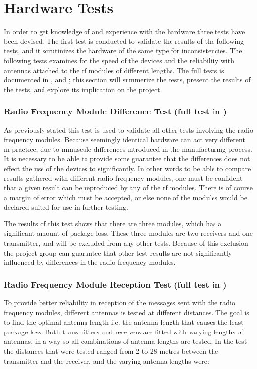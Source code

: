 \section{Hardware Tests} %
\label{sec:hardware_tests}
In order to get knowledge of and experience with the hardware three tests have been devised.
The first test is conducted to validate the results of the following tests, and it scrutinizes the hardware of the same type for inconsistencies.
The following tests examines for the speed of the devices and the reliability with antennas attached to the \gls{rf} modules of different lengths.
The full tests is documented in ,  and ; 
this section will summerize the tests, present the results of the tests, and explore its implication on the project.

\subsubsection*{Radio Frequency Module Difference Test (full test in )}%
\label{ssub:radio_frequency_module_difference_test}
As previously stated this test is used to validate all other tests involving the radio frequency modules.
Because seemingly identical hardware can act very different in practice, due to minuscule differences introduced in the manufacturing process.
It is necessary to be able to provide some guarantee that the differences does not effect the use of the devices to significantly.
In other words to be able to compare results gathered with different radio frequency modules, one must be confident that a given result can be reproduced by any of the \gls{rf} modules.
There is of course a margin of error which must be accepted, or else none of the modules would be declared suited for use in further testing.

The results of this test shows that there are three modules, which has a significant amount of package loss.
These three modules are two receivers and one transmitter, and will be excluded from any other tests.
Because of this exclusion the project group can guarantee that other test results are not significantly influenced by differences in the radio frequency modules. 

\subsubsection*{Radio Frequency Module Reception Test (full test in )} %
\label{ssub:radio_frequency_module_reception_test}
To provide better reliability in reception of the messages sent with the radio frequency modules, different antennas is tested at different distances.
The goal is to find the optimal antenna length i.e. the antenna length that causes the least package loss.
Both transmitters and receivers are fitted with varying lengths of antennas, in a way so all combinations of antenna lengths are tested. 
In the test the distances that were tested ranged from 2 to 28 metres between the transmitter and the receiver, and the varying antenna lengths were:

